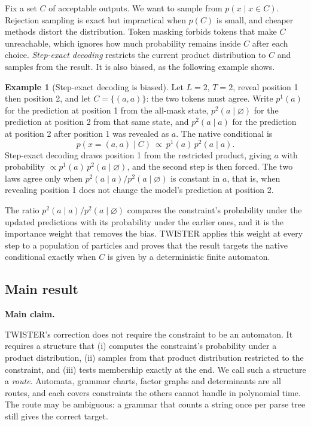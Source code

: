 \documentclass[11pt]{article}
\theoremstyle{definition}
\newtheorem{example}[theorem]{Example}
\newenvironment{claimbox}[1]
  {\begin{mdframed}[linewidth=0.6pt,roundcorner=2pt,backgroundcolor=black!3,
    innertopmargin=6pt,innerbottommargin=6pt]\textbf{#1}\par\smallskip}
  {\end{mdframed}}
\begin{document}
Fix a set $C$ of acceptable outputs. We want to sample from $p(x\mid x\in C)$. Rejection sampling is exact but
impractical when $p(C)$ is small, and cheaper methods distort the distribution. Token masking forbids tokens that
make $C$ unreachable, which ignores how much probability remains inside $C$ after each choice. \emph{Step-exact
decoding} \cite{de26} restricts the current product distribution to $C$ and samples from the result. It is also
biased, as the following example shows.

\begin{example}[Step-exact decoding is biased]\label{ex:bias}
Let $L=2$, $T=2$, reveal position 1 then position 2, and let $C=\{(a,a)\}$: the two tokens must agree. Write
$p^1(a)$ for the prediction at position 1 from the all-mask state, $p^2(a\mid\varnothing)$ for the prediction at
position 2 from that same state, and $p^2(a\mid a)$ for the prediction at position 2 after position 1 was revealed
as $a$. The native conditional is
\[
  p(x=(a,a)\mid C)\ \propto\ p^1(a)\,p^2(a\mid a).
\]
Step-exact decoding draws position 1 from the restricted product, giving $a$ with probability
$\propto p^1(a)\,p^2(a\mid\varnothing)$, and the second step is then forced. The two laws agree only when
$p^2(a\mid a)/p^2(a\mid\varnothing)$ is constant in $a$, that is, when revealing position 1 does not change the
model's prediction at position 2.
\end{example}

The ratio $p^2(a\mid a)/p^2(a\mid\varnothing)$ compares the constraint's probability under the updated predictions
with its probability under the earlier ones, and it is the importance weight that removes the bias. TWISTER
\cite{twister} applies this weight at every step to a population of particles and proves that the result targets
the native conditional exactly when $C$ is given by a deterministic finite automaton.

\subsection{Main result}

\begin{claimbox}{Main claim.}
TWISTER's correction does not require the constraint to be an automaton. It requires a structure that
(i) computes the constraint's probability under a product distribution, (ii) samples from that product
distribution restricted to the constraint, and (iii) tests membership exactly at the end. We call such a
structure a \emph{route}. Automata, grammar charts, factor graphs and determinants are all routes, and each
covers constraints the others cannot handle in polynomial time. The route may be ambiguous: a grammar that counts
a string once per parse tree still gives the correct target.
\end{claimbox}
\end{document}
